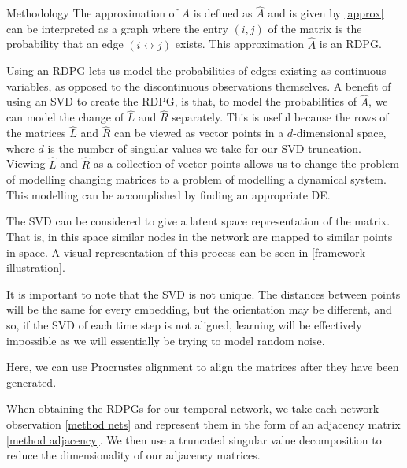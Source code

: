 \documentclass[12pt]{amsbook}
\begin{document}
\begin{chapter}{Methodology}
            The approximation of $A$ is defined as $\hat A$ and is given by \cref{approx} can be interpreted as a graph where the entry $(i,j)$ of the matrix is the probability that an edge $(i \leftrightarrow j)$ exists. This approximation $\hat A$ is an RDPG\cite{athreya2017statistical}.

            Using an RDPG lets us model the probabilities of edges existing as continuous variables, as opposed to the discontinuous observations themselves. A benefit of using an SVD to create the RDPG, is that, to model the probabilities of $\hat A$, we can model the change of $\hat L$ and $\hat R$ separately. This is useful because the rows of the matrices $\hat L$ and $\hat R$ can be viewed as vector points in a $d$-dimensional space, where $d$ is the number of singular values we take for our SVD truncation. Viewing $\hat L$ and $\hat R$ as a collection of vector points allows us to change the problem of modelling changing matrices to a problem of modelling a dynamical system. This modelling can be accomplished by finding an appropriate DE.

            
            The SVD can be considered to give a latent space representation of the matrix\cite{hoff2002latent}. That is, in this space similar nodes in the network are mapped to similar points in space. A visual representation of this process can be seen in \cref{framework illustration}. 

            It is important to note that the SVD is not unique. The distances between points will be the same for every embedding, but the orientation may be different, and so, if the SVD of each time step is not aligned, learning will be effectively impossible as we will essentially be trying to model random noise. 

            Here, we can use Procrustes alignment\cite{DotProductGraphs} to align the matrices after they have been generated.
            
            When obtaining the RDPGs for our temporal network, we take each network observation \cref{method nets} and represent them in the form of an adjacency matrix \cref{method adjacency}. We then use a truncated singular value decomposition to reduce the dimensionality of our adjacency matrices\cite{golub1971singular}. 
            

\end{chapter}
\end{document}
